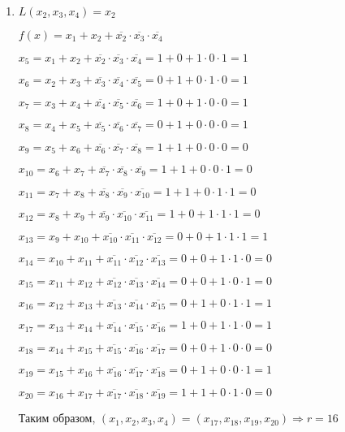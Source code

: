 \documentclass[utf8x, 14pt]{G7-32} %
\begin{document}
\begin{enumerate}
    \item $L(x_2,x_3,x_4) = x_2$
    
    $f(x) = x_1 + x_2 + \overline{x_2}\cdot \overline{x_3}\cdot \overline{x_4}$
    
    $x_5 = x_1 + x_2 + \overline{x_2}\cdot \overline{x_3}\cdot \overline{x_4} = 1 + 0 + 1\cdot0\cdot1=1$
    
    $x_6 = x_2 + x_3 +  \overline{x_3}\cdot \overline{x_4}\cdot \overline{x_5} = 0 + 1 + 0\cdot1\cdot0 = 1$
    
    $x_7 = x_3 + x_4 +  \overline{x_4}\cdot \overline{x_5}\cdot \overline{x_6} = 1 + 0 + 1\cdot0\cdot0 = 1$
    
    $x_8 = x_4 + x_5 +  \overline{x_5}\cdot \overline{x_6}\cdot \overline{x_7} = 0 + 1 + 0\cdot0\cdot0 = 1$
    
    $x_9 = x_5 + x_6 +  \overline{x_6}\cdot \overline{x_7}\cdot \overline{x_8} = 1 + 1 + 0\cdot0\cdot0 = 0$
    
    $x_{10} = x_6 + x_7 +  \overline{x_7}\cdot \overline{x_8}\cdot \overline{x_9} = 1 + 1 + 0\cdot0\cdot1 = 0$
    
    $x_{11} = x_7 + x_8 +  \overline{x_8}\cdot \overline{x_9}\cdot \overline{x_{10}} = 1 + 1 + 0\cdot1\cdot1 = 0$
    
    $x_{12} = x_8 + x_9 +  \overline{x_9}\cdot \overline{x_{10}}\cdot \overline{x_{11}} = 1 + 0 + 1\cdot1\cdot1 = 0$
    
    $x_{13} = x_9 + x_{10} +  \overline{x_{10}}\cdot \overline{x_{11}}\cdot \overline{x_{12}} = 0 + 0 + 1\cdot1\cdot1 = 1$
    
    $x_{14} = x_{10} + x_{11} +  \overline{x_{11}}\cdot \overline{x_{12}}\cdot \overline{x_{13}} = 0 + 0 + 1\cdot1\cdot0 = 0$
    
    $x_{15} = x_{11} + x_{12} +  \overline{x_{12}}\cdot \overline{x_{13}}\cdot \overline{x_{14}} = 0 + 0 + 1\cdot0\cdot1 = 0$
    
    $x_{16} = x_{12} + x_{13} +  \overline{x_{13}}\cdot \overline{x_{14}}\cdot \overline{x_{15}} = 0 + 1 + 0\cdot1\cdot1 = 1$
    
    $x_{17} = x_{13} + x_{14} +  \overline{x_{14}}\cdot \overline{x_{15}}\cdot \overline{x_{16}} = 1 + 0 + 1\cdot1\cdot0 = 1$
    
    $x_{18} = x_{14} + x_{15} +  \overline{x_{15}}\cdot \overline{x_{16}}\cdot \overline{x_{17}} = 0 + 0 + 1\cdot0\cdot0 = 0$
    
    $x_{19} = x_{15} + x_{16} +  \overline{x_{16}}\cdot \overline{x_{17}}\cdot \overline{x_{18}} = 0 + 1 + 0\cdot0\cdot1 = 1$
    
    $x_{20} = x_{16} + x_{17} +  \overline{x_{17}}\cdot \overline{x_{18}}\cdot \overline{x_{19}} = 1 + 1 + 0\cdot1\cdot0 = 0$
    
    Таким образом, $(x_1, x_2, x_3, x_4) = (x_{17}, x_{18}, x_{19}, x_{20}) \Rightarrow r = 16$
    
\end{enumerate}



\backmatter %





%

%
\end{document}
